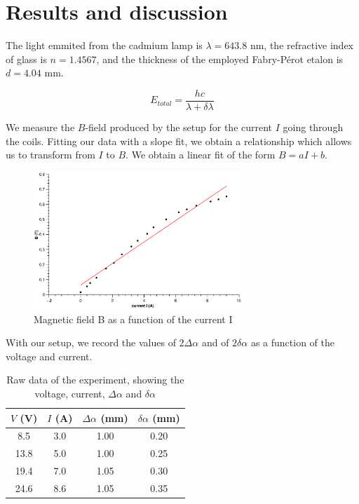 \documentclass{scrartcl}
\begin{document}
\section{Results and discussion}
The light emmited from the cadmium lamp is $\lambda = 643.8$ nm, the refractive index of glass is $n=1.4567$, and the thickness of the employed Fabry-Pérot etalon is $d=4.04$ mm.

\begin{equation}
    E_{total} = \frac{hc}{\lambda +\delta \lambda}
\end{equation}

We measure the $B$-field produced by the setup for the current $I$ going through the coils. Fitting our data with a slope fit, we obtain a relationship which allows us to transform from $I$ to $B$. We obtain a linear fit of the form $B = aI+b$.

\begin{figure}[h!]
    \centering
    \includegraphics[width=0.7\textwidth]{B_function_I.eps}
    \caption{Magnetic field B as a function of the current I}
    \label{fig:B(I)}
\end{figure}


With our setup, we record the values of $2 \Delta \alpha$ and of $2 \delta \alpha$ as a function of the voltage and current.
\begin{table}[!ht]
    \centering
    \begin{tabular}{c|c|c|c}
        $V$ (V) & $I$ (A) & $\Delta \alpha$ (mm) & $\delta \alpha$ (mm) \\ \hline
        8.5  & 3.0 & 1.00 & 0.20 \\
        13.8 & 5.0 & 1.00 & 0.25 \\
        19.4 & 7.0 & 1.05 & 0.30 \\
        24.6 & 8.6 & 1.05 & 0.35
    \end{tabular}
    \caption{Raw data of the experiment, showing the voltage, current, $\Delta \alpha$ and $\delta \alpha$}
    \label{tab:rawData}
\end{table}
\end{document}
